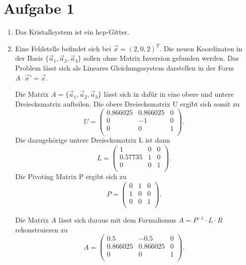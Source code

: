\section*{Aufgabe 1}

\begin{enumerate}[label=\alph*)]

\item Das Kristallsystem ist ein hcp-Gitter.

\item Eine Fehlstelle befindet sich bei $\vec x = (2,0,2)^T$. Die neuen Koordinaten in der Basis $\{\vec a_1, \vec a_2, \vec a_3\}$ sollen ohne Matrix Inversion gefunden werden.
Das Problem lässt sich als Lineares Gleichungssystem darstellen in der Form $A \cdot \vec x' = \vec x$.

Die Matrix $A = \{\vec a_1, \vec a_2, \vec a_3\}$ lässt sich in dafür in eine obere und untere Dreiecksmatrix aufteilen. Die obere Dreiecksmatrix U ergibt sich somit zu 
\begin{equation*}
U = \begin{pmatrix}
       \num{0.866025}	&\num{0.866025}	& 0 \\
        0	        &-1	        & 0 \\
        0	        &0	        & 1 \\
    \end{pmatrix}.
\end{equation*}
Die dazugehörige untere Dreiecksmatrix L ist dann
\begin{equation*}
    L = \begin{pmatrix}
    1	    & 0 &	0 \\
    0.57735	& 1 &	0 \\
    0	    & 0 &	1 \\
\end{pmatrix}.
\end{equation*}
Die Pivoting Matrix P ergibt sich zu 
\begin{equation*}
    P = \begin{pmatrix}
        0	&1 &	0 \\
        1	&0 &	0 \\
        0	&0 &	1 \\
\end{pmatrix}.
\end{equation*}

Die Matrix $A$ lässt sich daraus mit dem Formalismus $A = P^{-1}\cdot L\cdot R$ rekonstruieren zu
\begin{equation*}
    A = \begin{pmatrix}
        \num{0.5}	        &\num{-0.5}	    &0 \\
        \num{0.866025}	& \num{0.866025}	&0 \\
        0	        &0	        &1 \\
\end{pmatrix}.
\end{equation*}


\end{enumerate}
